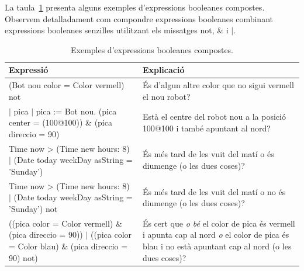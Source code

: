 La taula~\ref{tab2002} presenta alguns exemples d'expressions booleanes compostes. Observem detalladament com compondre expressions booleanes combinant expressions booleanes senzilles utilitzant els missatges \textsf{not}, \textsf{\&} i \textsf{$|$}.
\begin{table}[h]
\caption{Exemples d'expressions booleanes compostes.}
\label{tab2002}
\setlength{\extrarowheight}{1mm}
{\small \begin{tabular}{p{70mm}p{70mm}}
\hline
\textbf{Expressió} & \textbf{Explicació} \\
\hline
\textsf{(Bot nou color = Color vermell) not} & És d'algun altre color que no sigui vermell el nou robot? \\
\textsf{
\noindent
\hspace*{-1mm}$|$ pica $|$ \newline 
pica := Bot nou. \newline
(pica center = (100@100)) \& \newline
(pica direccio = 90)
} &  Està el centre del robot nou a la posició \textsf{100@100} i també apuntant al nord?\\
\textsf{
\noindent
\hspace*{-1mm}Time now \textgreater \hspace*{1mm} (Time new hours: 8) $|$ \newline
(Date today weekDay asString = 'Sunday')
} & És més tard de les vuit del matí o és diumenge (o les dues coses)?\\
\textsf{
\noindent
\hspace*{-1mm}Time now \textgreater \hspace*{1mm} (Time new hours: 8) $|$ \newline
(Date today weekDay asString = 'Sunday') not
} & És més tard de les vuit del matí o no és diumenge (o les dues coses)?\\
\textsf{
\noindent
\hspace*{-1mm}((pica color = Color vermell) \& \newline
(pica direccio = 90)) $|$ \newline
((pica color = Color blau) \& \newline
(pica direccio = 90) not)
} &  És cert que \emph{o bé} el color de pica és vermell i apunta cap al nord \emph{o} el color de pica és blau i no està apuntant cap al nord (o les dues coses)?\\
\hline
\end{tabular}}
\end{table}

